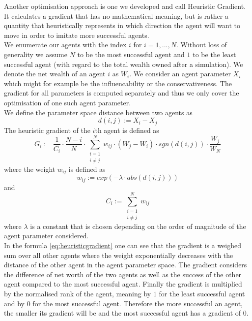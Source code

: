 \documentclass[11pt]{article}
\begin{document}
Another optimisation approach is one we developed and call Heuristic Gradient. It calculates a gradient that has no mathematical meaning, but is rather a quantity that heuristically represents in which direction the agent will want to move in order to imitate more successful agents. \\
We enumerate our agents with the index $i$ for $i=1,...,N$. Without loss of generality we assume $N$ to be the most successful agent and $1$ to be the least successful agent (with regard to the total wealth owned after a simulation). We denote the net wealth of an agent $i$ as $W_i$. We consider an agent parameter $X_i$ which might for example be the influencability or the conservativeness. The gradient for all parameters is computed separately and thus we only cover the optimisation of one such agent parameter. \\
We define the parameter space distance between two agents as
\begin{equation}
  d(i,j):=X_i-X_j
\end{equation}
The heuristic gradient of the $i$th agent is defined as \\
\begin{equation}\label{eq:heuristicgradient}
  G_i:=\frac{1}{C_i}\cdot \frac{N-i}{N} \cdot \sum\limits_{\substack{i=1 \\ i\neq j}}^{N}{ w_{ij} \cdot (W_j - W_i) \cdot sgn(d(i,j)) \cdot \frac{W_j}{W_N} }
\end{equation}
where the weight $w_{ij}$ is defined as
\begin{equation}
  w_{ij}:=exp(-\lambda \cdot abs(d(i,j)))
\end{equation}
and
\begin{equation}
  C_i:=\sum\limits_{\substack{i=1 \\ i\neq j}}^{N}{w_{ij}}
\end{equation}
where $\lambda$ is a constant that is chosen depending on the order of magnitude of the agent parameter considered. \\
In the formula \ref{eq:heuristicgradient} one can see that the gradient is a weighed sum over all other agents where the weight exponentially decreases with the distance of the other agent in the agent parameter space. The gradient considers the difference of net worth of the two agents as well as the success of the other agent compared to the most successful agent. Finally the gradient is multiplied by the normalised rank of the agent, meaning by $1$ for the least successful agent and by $0$ for the most successful agent. Therefore the more successful an agent, the smaller its gradient will be and the most successful agent has a gradient of $0$. \\
\end{document}
